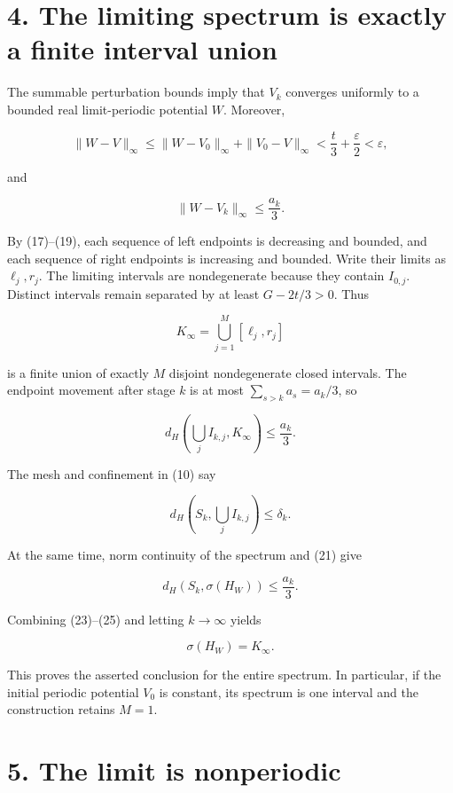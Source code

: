\documentclass[11pt,a4paper]{article}
\begin{document}
\hypertarget{1031-the-limiting-spectrum-is-exactly-a-finite-interval-union}{%
\section{4. The limiting spectrum is exactly a finite interval
union}\label{1031-the-limiting-spectrum-is-exactly-a-finite-interval-union}}

The summable perturbation bounds imply that \(V_k\) converges uniformly
to a bounded real limit-periodic potential \(W\). Moreover,

\[
\|W-V\|_\infty
\leq\|W-V_0\|_\infty+\|V_0-V\|_\infty
<\frac t3+\frac{\varepsilon}{2}
<\varepsilon,
\tag{20}
\]

and

\[
\|W-V_k\|_\infty\leq\frac{a_k}{3}.
\tag{21}
\]

By (17)--(19), each sequence of left endpoints is decreasing and
bounded, and each sequence of right endpoints is increasing and bounded.
Write their limits as \(\ell_j,r_j\). The limiting intervals are
nondegenerate because they contain \(I_{0,j}\). Distinct intervals
remain separated by at least \(G-2t/3>0\). Thus

\[
K_\infty=\bigcup_{j=1}^{M}[\ell_j,r_j]
\tag{22}
\]

is a finite union of exactly \(M\) disjoint nondegenerate closed
intervals. The endpoint movement after stage \(k\) is at most
\(\sum_{s>k}a_s=a_k/3\), so

\[
d_H\!\left(\bigcup_j I_{k,j},K_\infty\right)
\leq\frac{a_k}{3}.
\tag{23}
\]

The mesh and confinement in (10) say

\[
d_H\!\left(S_k,\bigcup_jI_{k,j}\right)\leq\delta_k.
\tag{24}
\]

At the same time, norm continuity of the spectrum and (21) give

\[
d_H(S_k,\sigma(H_W))\leq\frac{a_k}{3}.
\tag{25}
\]

Combining (23)--(25) and letting \(k\to\infty\) yields

\[
\boxed{\sigma(H_W)=K_\infty.}
\tag{26}
\]

This proves the asserted conclusion for the entire spectrum. In
particular, if the initial periodic potential \(V_0\) is constant, its
spectrum is one interval and the construction retains \(M=1\).

\hypertarget{1031-the-limit-is-nonperiodic}{%
\section{5. The limit is nonperiodic}\label{1031-the-limit-is-nonperiodic}}
\end{document}
